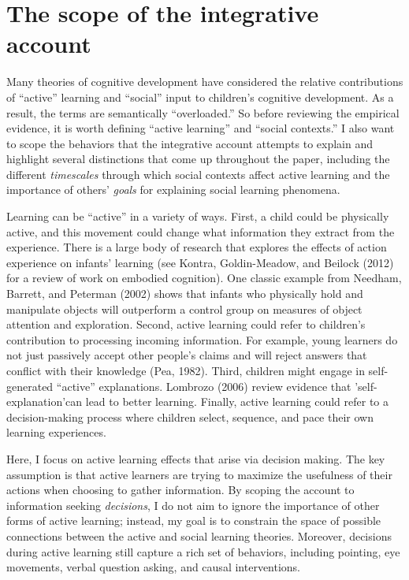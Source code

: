 \documentclass[english,floatsintext,man]{apa6}
\theoremstyle{definition}
\theoremstyle{definition}
\theoremstyle{definition}
\theoremstyle{remark}
\begin{document}
\section{The scope of the integrative
account}\label{the-scope-of-the-integrative-account}

Many theories of cognitive development have considered the relative
contributions of \enquote{active} learning and \enquote{social} input to
children's cognitive development. As a result, the terms are
semantically \enquote{overloaded.} So before reviewing the empirical
evidence, it is worth defining \enquote{active learning} and
\enquote{social contexts.} I also want to scope the behaviors that the
integrative account attempts to explain and highlight several
distinctions that come up throughout the paper, including the different
\emph{timescales} through which social contexts affect active learning
and the importance of others' \emph{goals} for explaining social
learning phenomena.

Learning can be \enquote{active} in a variety of ways. First, a child
could be physically active, and this movement could change what
information they extract from the experience. There is a large body of
research that explores the effects of action experience on infants'
learning (see Kontra, Goldin-Meadow, and Beilock (2012) for a review of
work on embodied cognition). One classic example from Needham, Barrett,
and Peterman (2002) shows that infants who physically hold and
manipulate objects will outperform a control group on measures of object
attention and exploration. Second, active learning could refer to
children's contribution to processing incoming information. For example,
young learners do not just passively accept other people's claims and
will reject answers that conflict with their knowledge (Pea, 1982).
Third, children might engage in self-generated \enquote{active}
explanations. Lombrozo (2006) review evidence that 'self-explanation'can
lead to better learning. Finally, active learning could refer to a
decision-making process where children select, sequence, and pace their
own learning experiences.

Here, I focus on active learning effects that arise via decision making.
The key assumption is that active learners are trying to maximize the
usefulness of their actions when choosing to gather information. By
scoping the account to information seeking \emph{decisions}, I do not
aim to ignore the importance of other forms of active learning; instead,
my goal is to constrain the space of possible connections between the
active and social learning theories. Moreover, decisions during active
learning still capture a rich set of behaviors, including pointing, eye
movements, verbal question asking, and causal interventions.
\end{document}
